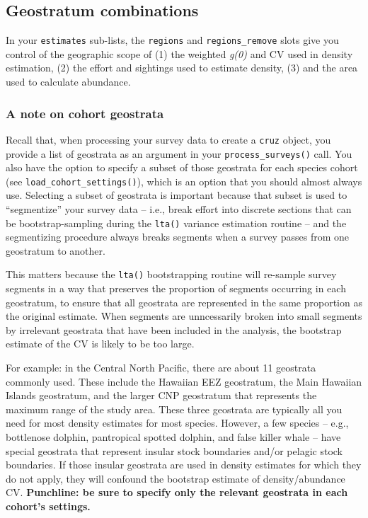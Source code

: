 \documentclass[
]{book}
\begin{document}
\hypertarget{geostratum-combinations}{%
\subsection*{Geostratum combinations}\label{geostratum-combinations}}

In your \texttt{estimates} sub-lists, the \texttt{regions} and \texttt{regions\_remove} slots give you control of the geographic scope of (1) the weighted \emph{g(0)} and CV used in density estimation, (2) the effort and sightings used to estimate density, (3) and the area used to calculate abundance.

\hypertarget{a-note-on-cohort-geostrata}{%
\subsubsection*{A note on cohort geostrata}\label{a-note-on-cohort-geostrata}}

Recall that, when processing your survey data to create a \texttt{cruz} object, you provide a list of geostrata as an argument in your \texttt{process\_surveys()} call. You also have the option to specify a subset of those geostrata for each species cohort (see \texttt{load\_cohort\_settings()}), which is an option that you should almost always use. Selecting a subset of geostrata is important because that subset is used to ``segmentize'' your survey data -- i.e., break effort into discrete sections that can be bootstrap-sampling during the \texttt{lta()} variance estimation routine -- and the segmentizing procedure always breaks segments when a survey passes from one geostratum to another.

This matters because the \texttt{lta()} bootstrapping routine will re-sample survey segments in a way that preserves the proportion of segments occurring in each geostratum, to ensure that all geostrata are represented in the same proportion as the original estimate. When segments are unncessarily broken into small segments by irrelevant geostrata that have been included in the analysis, the bootstrap estimate of the CV is likely to be too large.

For example: in the Central North Pacific, there are about 11 geostrata commonly used. These include the Hawaiian EEZ geostratum, the Main Hawaiian Islands geostratum, and the larger CNP geostratum that represents the maximum range of the study area. These three geostrata are typically all you need for most density estimates for most species. However, a few species -- e.g., bottlenose dolphin, pantropical spotted dolphin, and false killer whale -- have special geostrata that represent insular stock boundaries and/or pelagic stock boundaries. If those insular geostrata are used in density estimates for which they do not apply, they will confound the bootstrap estimate of density/abundance CV. \textbf{Punchline: be sure to specify only the relevant geostrata in each cohort's settings.}
\end{document}
